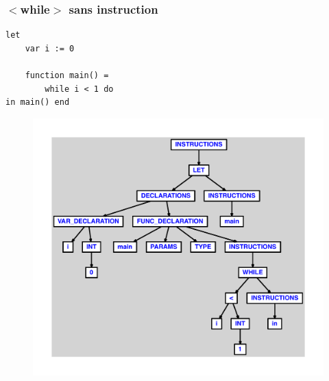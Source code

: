 \documentclass{article}
\begin{document}
\subsubsection{$ < $while$ > $ sans instruction}
\begin{lstlisting}
let
	var i := 0

	function main() =
		while i < 1 do
in main() end
\end{lstlisting}
\newpage
\begin{figure}[H]
\centering
\includegraphics[max width=\textwidth]{ast/ast_333.pdf}
\end{figure}
\newpage
\end{document}
